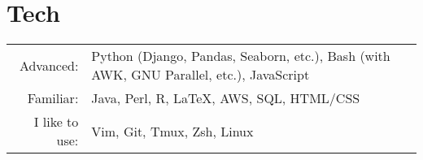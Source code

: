 \documentclass[a4paper,10pt]{article} %
\begin{document}










\section{Tech}
\begin{tabular}{rl}

    Advanced: & Python (Django, Pandas, Seaborn, etc.), Bash (with AWK, GNU Parallel, etc.), JavaScript \\
    Familiar: & Java, Perl, R, LaTeX, AWS, SQL, HTML/CSS \\
    I like to use: & Vim, Git, Tmux, Zsh, Linux \\

\end{tabular}
\end{document}
